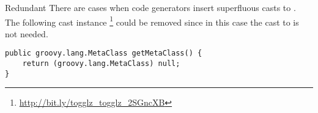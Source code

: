 \begin{pattern}{Redundant}
There are cases when code generators insert superfluous casts to .
The following cast instance%
\footnote{\url{http://bit.ly/togglz_togglz_2SGncXB}}
could be removed since in this case the cast to  is not needed.

\begin{verbatim}
public groovy.lang.MetaClass getMetaClass() {
    return (groovy.lang.MetaClass) null;
}
\end{verbatim}

\detection{}

\discussion{}

\related{}
    
\end{pattern}